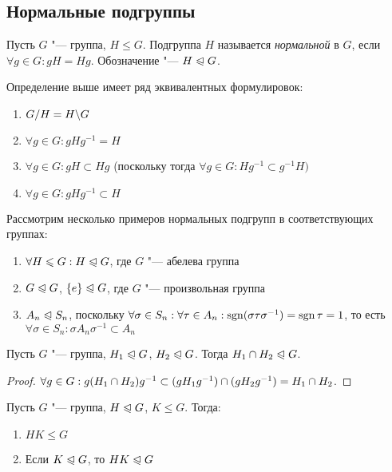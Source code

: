 \subsection{Нормальные подгруппы}

\begin{definition}
	Пусть $G$ "--- группа, $H \le G$. Подгруппа $H$ называется \textit{нормальной} в $G$, если $\forall g \in G: gH = Hg$. Обозначение "--- $H \trianglelefteqslant G$.
\end{definition}

\begin{note}
	Определение выше имеет ряд эквивалентных формулировок:
	\begin{enumerate}
		\item $G / H = H \backslash G$
		\item $\forall g \in G: gHg^{-1} = H$
		\item $\forall g \in G: gH \subset Hg$ (поскольку тогда $\forall g \in G: Hg^{-1} \subset g^{-1}H)$
		\item $\forall g \in G: gHg^{-1} \subset H$
	\end{enumerate}
\end{note}

\begin{example}
	Рассмотрим несколько примеров нормальных подгрупп в соответствующих группах:
	\begin{enumerate}
		\item $\forall H \leqslant G: H \trianglelefteqslant G$, где $G$ "--- абелева группа
		\item $G \trianglelefteqslant G$, $\{e\} \trianglelefteqslant G$, где $G$ "--- произвольная группа
		\item $A_n \trianglelefteqslant S_n$, поскольку $\forall \sigma \in S_n: \forall \tau \in A_n: \operatorname{\mathop{sgn}}(\sigma\tau\sigma^{-1}) = \operatorname{\mathop{sgn}}\tau = 1$, то есть $\forall \sigma \in S_n: \sigma A_n\sigma^{-1} \subset A_n$
	\end{enumerate}
\end{example}

\begin{proposition}
	Пусть $G$ "--- группа, $H_1 \trianglelefteqslant G$, $H_2 \trianglelefteqslant G$. Тогда $H_1 \cap H_2 \hm\normal G$.
\end{proposition}

\begin{proof}
	$\forall g \in G: g(H_1 \cap H_2)g^{-1} \subset (gH_1g^{-1}) \cap (gH_2g^{-1}) \hm= H_1 \cap H_2$.
\end{proof}

\begin{proposition}
	Пусть $G$ "--- группа, $H \trianglelefteqslant G$, $K \le G$. Тогда:
	\begin{enumerate}
		\item $HK \le G$
		\item Если $K \trianglelefteqslant G$, то $HK \trianglelefteqslant G$
	\end{enumerate}
\end{proposition}

